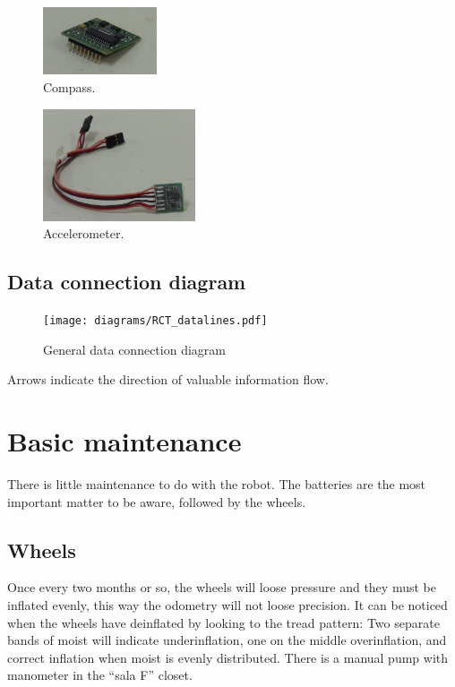\begin{figure}[ht]
\centering
 \includegraphics[width=0.3\textwidth]{figures/device_photos/compass.jpg}
\caption{Compass.}
\end{figure}

\begin{figure}[ht]
\centering
 \includegraphics[width=0.4\textwidth]{figures/device_photos/accel.jpg}
\caption{Accelerometer.}
\end{figure}

\clearpage


\subsection{Data connection diagram}

\begin{figure}
\centering
 \texttt{[image: diagrams/RCT\_datalines.pdf]}
\caption{General data connection diagram}
\label{fig:higgs_data_connections}
\end{figure}

Arrows indicate the direction of valuable information flow.


\section{Basic maintenance}
\label{sec:usermanual_maintenance}

There is little maintenance to do with the robot. The batteries are the most important matter to be aware, followed
by the wheels.

\subsection{Wheels}
Once every two months or so, the wheels will loose pressure
and they must be inflated evenly, this way the odometry will not loose precision. It can be noticed
when the wheels have deinflated by looking to the tread pattern: Two separate bands of moist will indicate underinflation,
one on the middle overinflation, and correct inflation when moist is evenly distributed. There is a manual pump with
manometer in the ``sala F'' closet.

